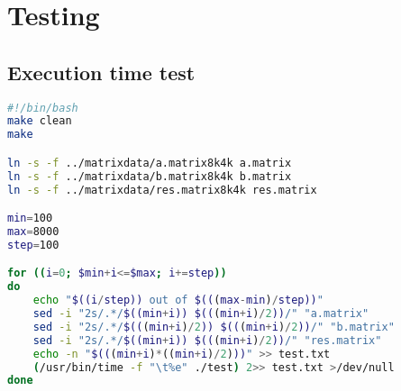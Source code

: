 \chapter{Testing}\label{app:testing}
\section{Execution time test}
\begin{lstlisting}[language=bash,caption={Bash script for automating execution time test},frame=tlrb]
#!/bin/bash
make clean
make

ln -s -f ../matrixdata/a.matrix8k4k a.matrix
ln -s -f ../matrixdata/b.matrix8k4k b.matrix
ln -s -f ../matrixdata/res.matrix8k4k res.matrix

min=100
max=8000
step=100

for ((i=0; $min+i<=$max; i+=step))
do
    echo "$((i/step)) out of $(((max-min)/step))"
    sed -i "2s/.*/$((min+i)) $(((min+i)/2))/" "a.matrix"
    sed -i "2s/.*/$(((min+i)/2)) $(((min+i)/2))/" "b.matrix"
    sed -i "2s/.*/$((min+i)) $(((min+i)/2))/" "res.matrix"
    echo -n "$(((min+i)*((min+i)/2)))" >> test.txt    
    (/usr/bin/time -f "\t%e" ./test) 2>> test.txt >/dev/null
done
\end{lstlisting}

